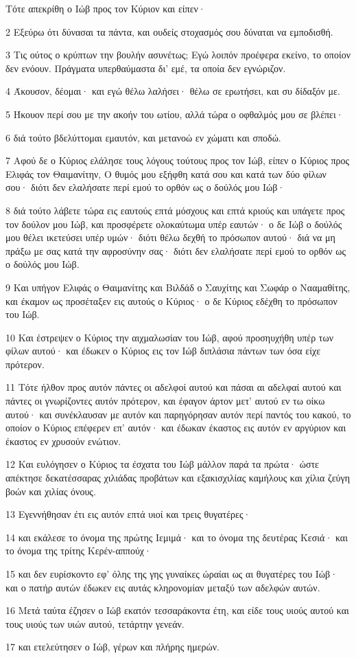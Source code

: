 \par Τότε απεκρίθη ο Ιώβ προς τον Κύριον και είπεν·
\par 2 Εξεύρω ότι δύνασαι τα πάντα, και ουδείς στοχασμός σου δύναται να εμποδισθή.
\par 3 Τις ούτος ο κρύπτων την βουλήν ασυνέτως; Εγώ λοιπόν προέφερα εκείνο, το οποίον δεν ενόουν. Πράγματα υπερθαύμαστα δι' εμέ, τα οποία δεν εγνώριζον.
\par 4 Άκουσον, δέομαι· και εγώ θέλω λαλήσει· θέλω σε ερωτήσει, και συ δίδαξόν με.
\par 5 Ήκουον περί σου με την ακοήν του ωτίου, αλλά τώρα ο οφθαλμός μου σε βλέπει·
\par 6 διά τούτο βδελύττομαι εμαυτόν, και μετανοώ εν χώματι και σποδώ.
\par 7 Αφού δε ο Κύριος ελάλησε τους λόγους τούτους προς τον Ιώβ, είπεν ο Κύριος προς Ελιφάς τον Θαιμανίτην, Ο θυμός μου εξήφθη κατά σου και κατά των δύο φίλων σου· διότι δεν ελαλήσατε περί εμού το ορθόν ως ο δούλός μου Ιώβ·
\par 8 διά τούτο λάβετε τώρα εις εαυτούς επτά μόσχους και επτά κριούς και υπάγετε προς τον δούλον μου Ιώβ, και προσφέρετε ολοκαύτωμα υπέρ εαυτών· ο δε Ιώβ ο δούλός μου θέλει ικετεύσει υπέρ υμών· διότι θέλω δεχθή το πρόσωπον αυτού· διά να μη πράξω με σας κατά την αφροσύνην σας· διότι δεν ελαλήσατε περί εμού το ορθόν ως ο δούλός μου Ιώβ.
\par 9 Και υπήγον Ελιφάς ο Θαιμανίτης και Βιλδάδ ο Σαυχίτης και Σωφάρ ο Νααμαθίτης, και έκαμον ως προσέταξεν εις αυτούς ο Κύριος· ο δε Κύριος εδέχθη το πρόσωπον του Ιώβ.
\par 10 Και έστρεψεν ο Κύριος την αιχμαλωσίαν του Ιώβ, αφού προσηυχήθη υπέρ των φίλων αυτού· και έδωκεν ο Κύριος εις τον Ιώβ διπλάσια πάντων των όσα είχε πρότερον.
\par 11 Τότε ήλθον προς αυτόν πάντες οι αδελφοί αυτού και πάσαι αι αδελφαί αυτού και πάντες οι γνωρίζοντες αυτόν πρότερον, και έφαγον άρτον μετ' αυτού εν τω οίκω αυτού· και συνέκλαυσαν με αυτόν και παρηγόρησαν αυτόν περί παντός του κακού, το οποίον ο Κύριος επέφερεν επ' αυτόν· και έδωκαν έκαστος εις αυτόν εν αργύριον και έκαστος εν χρυσούν ενώτιον.
\par 12 Και ευλόγησεν ο Κύριος τα έσχατα του Ιώβ μάλλον παρά τα πρώτα· ώστε απέκτησε δεκατέσσαρας χιλιάδας προβάτων και εξακισχιλίας καμήλους και χίλια ζεύγη βοών και χιλίας όνους.
\par 13 Εγεννήθησαν έτι εις αυτόν επτά υιοί και τρεις θυγατέρες·
\par 14 και εκάλεσε το όνομα της πρώτης Ιεμιμά· και το όνομα της δευτέρας Κεσιά· και το όνομα της τρίτης Κερέν-αππούχ·
\par 15 και δεν ευρίσκοντο εφ' όλης της γης γυναίκες ώραίαι ως αι θυγατέρες του Ιώβ· και ο πατήρ αυτών έδωκεν εις αυτάς κληρονομίαν μεταξύ των αδελφών αυτών.
\par 16 Μετά ταύτα έζησεν ο Ιώβ εκατόν τεσσαράκοντα έτη, και είδε τους υιούς αυτού και τους υιούς των υιών αυτού, τετάρτην γενεάν.
\par 17 και ετελεύτησεν ο Ιώβ, γέρων και πλήρης ημερών.


